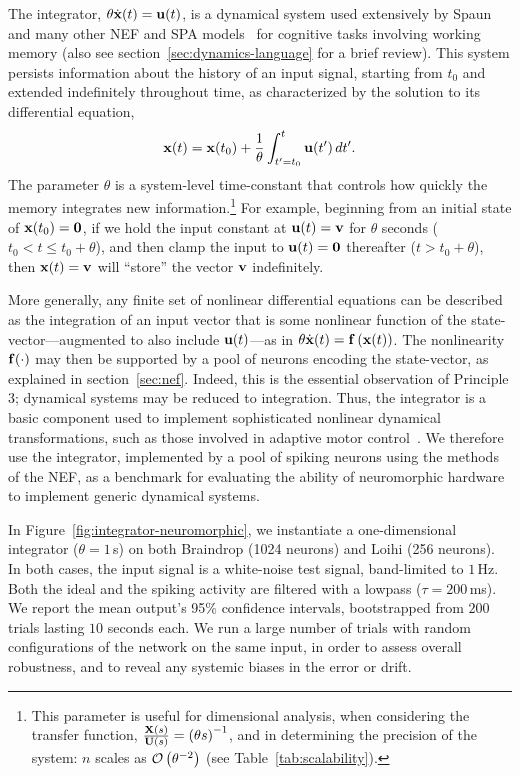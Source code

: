 The integrator, $\theta \dot{\mathbf{x}}(t) = \mathbf{u}(t)$, is a dynamical system used extensively by Spaun~\citep{eliasmith2012} and many other NEF and SPA models~\citep[][to name a few]{singh2004, trujillo2014a, rasmussen2017} for cognitive tasks involving working memory (also see section~\ref{sec:dynamics-language} for a brief review).
This system persists information about the history of an input signal, starting from $t_0$ and extended indefinitely throughout time, as characterized by the solution to its differential equation,
$$\mathbf{x}(t) = \mathbf{x}(t_0) + \frac{1}{\theta} \int_{t'=t_0}^{t} \mathbf{u}(t')\, dt' \text{.}$$
The parameter $\theta$ is a system-level time-constant that controls how quickly the memory integrates new information.\footnote{%
This parameter is useful for dimensional analysis, when considering the transfer function, $\frac{\mathbf{X}(s)}{\mathbf{U}(s)} = \left( \theta s \right)^{-1}$, and in determining the precision of the system: $n$ scales as $\mathcal{O}\left({\theta^{-2}}\right)$ (see Table~\ref{tab:scalability}).}
For example, beginning from an initial state of $\mathbf{x}(t_0) = \mathbf{0}$, if we hold the input constant at $\mathbf{u}(t) = \mathbf{v}$ for $\theta$ seconds ($t_0 < t \le t_0 + \theta$), and then clamp the input to $\mathbf{u}(t) = \mathbf{0}$ thereafter ($t > t_0 + \theta$), then $\mathbf{x}(t) = \mathbf{v}$ will ``store'' the vector $\mathbf{v}$ indefinitely.

More generally, any finite set of nonlinear differential equations can be described as the integration of an input vector that is some nonlinear function of the state-vector---augmented to also include $\mathbf{u}(t)$---as in $\theta \dot{\mathbf{x}}(t) = \mathbf{f}\left({\mathbf{x}(t)}\right)$.
The nonlinearity $\mathbf{f}(\cdot)$ may then be supported by a pool of neurons encoding the state-vector, as explained in section~\ref{sec:nef}.
Indeed, this is the essential observation of Principle 3; dynamical systems may be reduced to integration.
Thus, the integrator is a basic component used to implement sophisticated nonlinear dynamical transformations, such as those involved in adaptive motor control~\citep{dewolf2016}.
We therefore use the integrator, implemented by a pool of spiking neurons using the methods of the NEF, as a benchmark for evaluating the ability of neuromorphic hardware to implement generic dynamical systems.

In Figure~\ref{fig:integrator-neuromorphic}, we instantiate a one-dimensional integrator ($\theta = 1$\,s) on both Braindrop (1024 neurons) and Loihi (256 neurons).
In both cases, the input signal is a white-noise test signal, band-limited to $1$\,Hz.
Both the ideal and the spiking activity are filtered with a lowpass ($\tau = 200$\,ms).
We report the mean output's 95\% confidence intervals, bootstrapped from $200$ trials lasting $10$ seconds each.
We run a large number of trials with random configurations of the network on the same input, in order to assess overall robustness, and to reveal any systemic biases in the error or drift.

